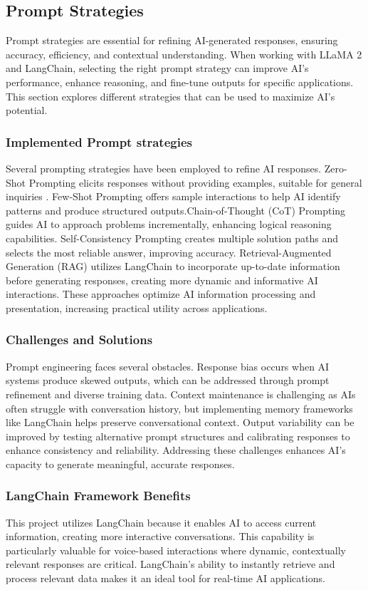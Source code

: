 \subsection{Prompt Strategies}
Prompt strategies are essential for refining AI-generated responses, ensuring accuracy, efficiency, and contextual understanding. When working with LLaMA 2 and LangChain, selecting the right prompt strategy can improve AI’s performance, enhance reasoning, and fine-tune outputs for specific applications. This section explores different strategies that can be used to maximize AI’s potential.

\subsubsection{ Implemented Prompt strategies }
Several prompting strategies have been employed to refine AI responses. Zero-Shot Prompting elicits 
responses without providing examples, suitable for general inquiries \cite{radford2019language}. Few-Shot Prompting offers 
sample interactions to help AI identify patterns and produce structured outputs.Chain-of-Thought (CoT) Prompting guides AI to approach problems incrementally, enhancing logical reasoning 
capabilities. Self-Consistency Prompting creates multiple solution paths and selects the most reliable 
answer, improving accuracy. Retrieval-Augmented Generation (RAG) utilizes LangChain to 
incorporate up-to-date information before generating responses, creating more dynamic and 
informative AI interactions\cite{lewis2020retrieval}. These approaches optimize AI information processing and presentation, 
increasing practical utility across applications.

\subsubsection{Challenges and Solutions}
Prompt engineering faces several obstacles. Response bias occurs when AI systems produce skewed 
outputs, which can be addressed through prompt refinement and diverse training data. Context 
maintenance is challenging as AIs often struggle with conversation history, but implementing 
memory frameworks like LangChain helps preserve conversational context. Output variability can be 
improved by testing alternative prompt structures and calibrating responses to enhance consistency 
and reliability. Addressing these challenges enhances AI's capacity to generate meaningful, accurate 
responses. 

\subsubsection{LangChain Framework Benefits} 
This project utilizes LangChain because it enables AI to access current information, creating more 
interactive conversations. This capability is particularly valuable for voice-based interactions where 
dynamic, contextually relevant responses are critical. LangChain's ability to instantly retrieve and 
process relevant data makes it an ideal tool for real-time AI applications. 

